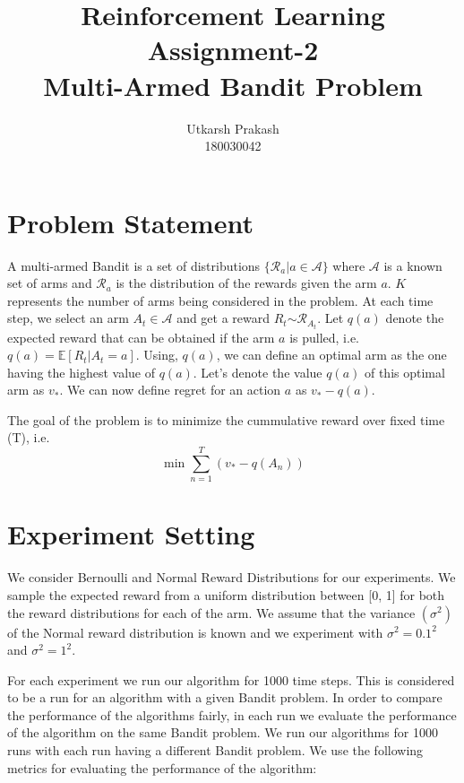 \documentclass{article}
\title{Reinforcement Learning Assignment-2 \\
	\Large Multi-Armed Bandit Problem \\}
\begin{document}
\author{Utkarsh Prakash \\ \normalsize 180030042}
\maketitle
\section{Problem Statement}
	A multi-armed Bandit is a set of distributions $\{\mathcal{R}_{a} | a \in \mathcal{A}\}$ where $\mathcal{A}$ is a known set of arms and $\mathcal{R}_{a}$ is the
	distribution of the rewards given the arm $a$. $K$ represents the number of arms being considered in the problem. At each time step, we select an arm 
	$A_{t} \in \mathcal{A}$ and get a reward $R_{t} \stackrel{}{\sim}
	\mathcal{R}_{A_{t}}$. Let $q(a)$ denote the expected reward that can be obtained if the arm $a$ is pulled, i.e. $q(a) = \mathbb{E}[R_{t} | A_{t} = a]$. Using,
	$q(a)$, we can define an optimal arm as the one having the highest value of $q(a)$. Let's denote the value $q(a)$ of this optimal arm as $v_{*}$. We can now 
	define regret for an action $a$ as $v_{*} - q(a)$. \par

	\noindent %
	The goal of the problem is to minimize the cummulative reward over fixed time (T), i.e.
	\begin{equation}
	\nonumber
		\min \sum_{n=1}^{T} (v_{*} - q(A_{n}))
	\end{equation}
\section{Experiment Setting}
	We consider Bernoulli and Normal Reward Distributions for our experiments. We sample the expected reward from a uniform distribution between [0, 1] for both the 
	reward distributions for each of the arm. We assume that the variance $(\sigma^{2})$ of the Normal reward distribution is known and we experiment with $\sigma^{2} = 0.1^{2}$ and
	$\sigma^{2} = 1^{2}$. \par
	
	\noindent %
	For each experiment we run our algorithm for 1000 time steps. This is considered to be a run for an algorithm with a given Bandit problem. In order to compare
	the performance of the algorithms fairly, in each run we evaluate the performance of the algorithm on the same Bandit problem. We run our algorithms for 1000
	runs with each run having a different Bandit problem. We use the following metrics for evaluating the performance of the algorithm:
	
\end{document}
